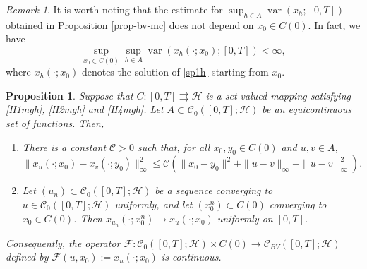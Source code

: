 \documentclass[preprint,12pt]{elsarticle}
\renewcommand{\H}{\mathcal{H}}
\newcommand{\tto}{\rightrightarrows}
\theoremstyle{plain}
\newtheorem{proposition}[theorem]{Proposition}
\theoremstyle{definition}
\theoremstyle{remark}
\newtheorem{remark}[theorem]{Remark}
\begin{document}
	
	
\begin{remark}\label{rmk-x0-independent}
It is worth noting that the estimate for $\sup_{h\in A} \operatorname{var}(x_h;[0,T])$ obtained in Proposition \ref{prop-bv-mc} does not depend on $x_0\in C(0)$. In fact, we have 
$$\sup_{x_0\in C(0)}\sup_{h\in A} \operatorname{var}(x_h(\cdot;x_0);[0,T])<\infty,$$
where $x_h(\cdot;x_0)$ denotes the solution of \eqref{sp1h} starting from $x_0$. 
\end{remark}
\begin{proposition}\label{lemma-cont-sol}
Suppose that $C\colon [0,T]\tto \H$ is a set-valued mapping satisfying \ref{H1mgh}, \ref{H2mgh} and \ref{H4mgh}. Let $A\subset\mathcal{C}_0([0,T];\H)$ be an equicontinuous set of functions. Then,
\begin{enumerate} 
\item[(a)] There is a constant $\mathscr{C}>0$ such that, for all $x_0,y_0\in C(0)$ and $u,v\in A$, 
\begin{equation*}
\|x_u(\cdot;x_0)-x_v(\cdot;y_0)\|^2_\infty\leq \mathscr{C}\left(\|x_0-y_0\|^2 + \|u-v\|_\infty + \|u-v\|_\infty^2\right).
\end{equation*}
\item[(b)] Let $(u_n)\subset \mathcal{C}_0([0,T];\H)$ be a sequence converging to $u\in\mathcal{C}_0([0,T];\H)$ uniformly, and let $(x_0^n)\subset C(0)$ converging to $x_0\in C(0)$. Then $x_{u_n}(\cdot;x_0^n)\to x_u(\cdot;x_0)$ uniformly on $[0,T]$. 
		\end{enumerate}
Consequently, the operator $\mathscr{F}\colon \mathcal{C}_0([0,T];\H)\times C(0)\to \mathcal{C}_{BV}([0,T];\H)$ defined by $\mathscr{F}(u,x_0) := x_u(\cdot;x_0)$ is continuous. 
	\end{proposition}
\end{document}
